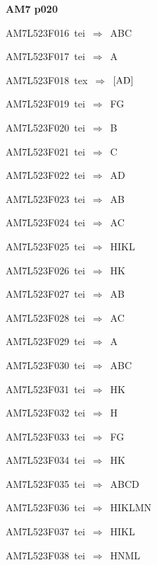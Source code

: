 \par\vfill\eject
{\bf\hfill AM7 p020\hfill\hbox{}}\par\bigskip
{\sixrm AM7L523F016\ {\sixit tei}\ }$\Rightarrow$\ ABC\par\smallskip
{\sixrm AM7L523F017\ {\sixit tei}\ }$\Rightarrow$\ A\par\smallskip
{\sixrm AM7L523F018\ {\sixit tex}\ }$\Rightarrow$\ $[{\rm AD}]$\par\smallskip
{\sixrm AM7L523F019\ {\sixit tei}\ }$\Rightarrow$\ FG\par\smallskip
{\sixrm AM7L523F020\ {\sixit tei}\ }$\Rightarrow$\ B\par\smallskip
{\sixrm AM7L523F021\ {\sixit tei}\ }$\Rightarrow$\ C\par\smallskip
{\sixrm AM7L523F022\ {\sixit tei}\ }$\Rightarrow$\ AD\par\smallskip
{\sixrm AM7L523F023\ {\sixit tei}\ }$\Rightarrow$\ AB\par\smallskip
{\sixrm AM7L523F024\ {\sixit tei}\ }$\Rightarrow$\ AC\par\smallskip
{\sixrm AM7L523F025\ {\sixit tei}\ }$\Rightarrow$\ HIKL\par\smallskip
{\sixrm AM7L523F026\ {\sixit tei}\ }$\Rightarrow$\ HK\par\smallskip
{\sixrm AM7L523F027\ {\sixit tei}\ }$\Rightarrow$\ AB\par\smallskip
{\sixrm AM7L523F028\ {\sixit tei}\ }$\Rightarrow$\ AC\par\smallskip
{\sixrm AM7L523F029\ {\sixit tei}\ }$\Rightarrow$\ A\par\smallskip
{\sixrm AM7L523F030\ {\sixit tei}\ }$\Rightarrow$\ ABC\par\smallskip
{\sixrm AM7L523F031\ {\sixit tei}\ }$\Rightarrow$\ HK\par\smallskip
{\sixrm AM7L523F032\ {\sixit tei}\ }$\Rightarrow$\ H\par\smallskip
{\sixrm AM7L523F033\ {\sixit tei}\ }$\Rightarrow$\ FG\par\smallskip
{\sixrm AM7L523F034\ {\sixit tei}\ }$\Rightarrow$\ HK\par\smallskip
{\sixrm AM7L523F035\ {\sixit tei}\ }$\Rightarrow$\ ABCD\par\smallskip
{\sixrm AM7L523F036\ {\sixit tei}\ }$\Rightarrow$\ HIKLMN\par\smallskip
{\sixrm AM7L523F037\ {\sixit tei}\ }$\Rightarrow$\ HIKL\par\smallskip
{\sixrm AM7L523F038\ {\sixit tei}\ }$\Rightarrow$\ HNML\par\smallskip

